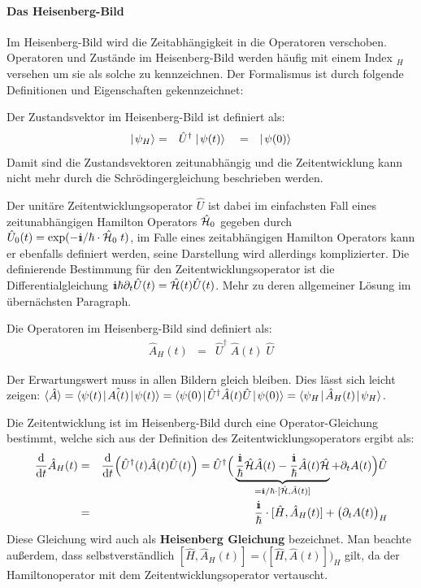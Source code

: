 \paragraph{Das Heisenberg-Bild}

Im Heisenberg-Bild wird die Zeitabhängigkeit in die Operatoren verschoben. Operatoren und Zustände im Heisenberg-Bild werden häufig mit einem Index $_H$ versehen um sie als solche zu kennzeichnen. Der Formalismus ist durch folgende Definitionen und Eigenschaften gekennzeichnet: 

\begin{itemize1}
	\item Der Zustandsvektor im Heisenberg-Bild ist definiert als: 
	\begin{eqnarray*}
		\ket{\psi_H} &=& \hat{U}^{\dagger}\ket{\psi(t)} \quad=\quad \ket{\psi(0)}
	\end{eqnarray*}
	Damit sind die Zustandsvektoren zeitunabhängig und die Zeitentwicklung kann nicht mehr durch die Schrödingergleichung beschrieben werden. 
	\item Der unitäre Zeitentwicklungsoperator $\hat{U}$ ist dabei im einfachsten Fall eines zeitunabhängigen Hamilton Operators $\hat{\mathcal H}_0$ gegeben durch $\hat{U}_0(t)=\exp(-\I/\hbar\cdot\hat{\ham}_0\;t)$, im Falle eines zeitabhängigen Hamilton Operators kann er ebenfalls definiert werden, seine Darstellung wird allerdings komplizierter. Die definierende Bestimmung für den Zeitentwicklungsoperator ist die Differentialgleichung $\I\hbar \dell_t \hat{U}(t)=\hat{\ham}(t)\hat{U}(t)$. Mehr zu deren allgemeiner Lösung im übernächsten Paragraph. 
	\item Die Operatoren im Heisenberg-Bild sind definiert als: 
	\begin{eqnarray*}
		\hat{A}_H(t) &=& \hat{U}^{\dagger}\;\hat{A}(t)\;\hat{U}
	\end{eqnarray*}
	\item Der Erwartungswert muss in allen Bildern gleich bleiben. Dies lässt sich leicht zeigen: $\EW{\hat{A}}=\bracket{\psi(t)}{\hat{A(t)}}{\psi(t)}=\bracket{\psi(0)}{\hat{U}^{\dagger}\hat{A}(t)\hat{U}}{\psi(0)}=\bracket{\psi_H}{\hat{A}_H(t)}{\psi_H}$. 
	\item Die Zeitentwicklung ist im Heisenberg-Bild durch eine Operator-Gleichung bestimmt, welche sich aus der Definition des Zeitentwicklungsoperators ergibt als: 
	\begin{eqnarray}
		\frac{\mathrm{d}}{\mathrm{d}t} \hat{A}_H(t) &=& \frac{\mathrm{d}}{\mathrm{d}t} \Big(\hat{U}^{\dagger}(t)\hat{A}(t)\hat{U}(t)\Big) = \hat{U}^{\dagger}\Big(\underbrace{\frac{\I}{\hbar}\hat{\ham}\hat{A}(t)-\frac{\I}{\hbar}\hat{A}(t)\hat{\ham}}_{=\I/\hbar\cdot[\hat{\ham},\hat{A}(t)]}+\dell_tA(t)\Big)\hat{U} \nonumber
		\\
		&=& \frac{\I}{\hbar}\cdot[\hat{H},\hat{A}_H(t)]+\big(\dell_tA(t)\big)_H \label{HG}
	\end{eqnarray}
	Diese Gleichung wird auch als {\bf Heisenberg Gleichung} bezeichnet. Man beachte außerdem, dass selbstverständlich $[\hat{H},\hat{A}_H(t)]=\big([\hat{H},\hat{A}(t)]\big)_H$ gilt, da der Hamiltonoperator mit dem Zeitentwicklungsoperator vertauscht. 
\end{itemize1} 


